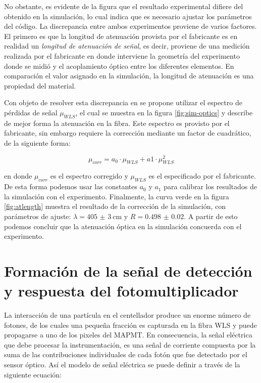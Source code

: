 No obstante, es evidente de la figura que el resultado experimental difiere del obtenido en la simulación, lo cual indica que es necesario ajustar los parámetros del código. La discrepancia entre ambos experimentos proviene de varios factores. El primero es que la longitud de atenuación provista por el fabricante es en realidad un \emph{longitud de atenuación de señal}, es decir, proviene de una medición realizada por el fabricante en donde interviene la geometría del experimento donde se midió y el acoplamiento óptico entre los diferentes elementos. En comparación el valor asignado en la simulación, la longitud de atenuación es una propiedad del material.

Con objeto de resolver esta discrepancia en \cite{dietz16} se propone utilizar el espectro de pérdidas de señal $\mu_{WLS}$, el cual se muestra en la figura \ref{fig:sim-optics} y describe de mejor forma la atenuación en la fibra. Este espectro es provisto por el fabricante, sin embargo requiere la corrección mediante un factor de cuadrático, de la siguiente forma:

\begin{equation}
\label{equ:quadcorr}
\mu_{corr}=a_{0}\cdot\mu_{WLS}+a{1}\cdot\mu^{2}_{WLS}
\end{equation}

en donde $\mu_{corr}$ es el espectro corregido y $\mu_{WLS}$ es el especificado por el fabricante. De esta forma podemos usar las constantes $a_{0}$ y $a_{1}$ para calibrar los resultados de la simulación con el experimento. Finalmente, la curva verde en la figura \ref{fig:atlength} muestra el resultado de la corrección de la simulación, con parámetros de ajuste: $\lambda=\SI{405(3)}{\cm}$ y $R=\num{0.498(20)}$. A partir de esto podemos concluir que la atenuación óptica en la simulación concuerda con el experimento.

\section{Formación de la señal de detección y respuesta del fotomultiplicador}

La interacción de una partícula en el centellador produce un enorme número de fotones, de los cuales una pequeña fracción es capturada en la fibra WLS y puede propagarse a uno de los pixeles del MAPMT. En consecuencia, la señal eléctrica que debe procesar la instrumentación, es una señal de corriente compuesta por la suma de las contribuciones individuales de cada fotón que fue detectado por el sensor óptico. Así el modelo de señal eléctrica se puede definir a través de la siguiente ecuación:

